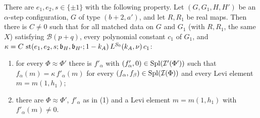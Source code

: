 \begin{lemma}\label{pf:thmK:keyA}
There are $e_1,e_2,s\in\{\pm1\}$ with the following property. Let $(G,G_1,H,H')$ be an $\alpha$-step configuration, $G$
of type $(b+2,a')$, and let $R,R_1$ be real maps. Then there is $C\ne0$ such that for all matched data on $G$ and $G_1$
(with $R,R_1$, the same $X$) satisfying $\mathcal B(p+q)$, every polynomial constant $c_1$ of $G_1$, and
$\kappa=C\,\operatorname{st}(e_1,e_2,s;\mathfrak b_H,\mathfrak b_{H'};1-k_A)\,L^{S_0}(k_A,\nu)\,c_1$:
\begin{enumerate}
\item for every $\Phi\approx\Phi'$ there is $f'_\alpha$ with $(f'_\alpha,0)\in\operatorname{Spl}(\mathcal{I}'(\Phi'))$ such that
$f_\alpha(m)=\kappa\,f'_\alpha(m)$ for every $(f_\alpha,f_\beta)\in\operatorname{Spl}(\mathcal{I}(\Phi))$ and every Levi element
$m=m(1,h_1)$;
\item there are $\Phi\approx\Phi'$, $f'_\alpha$ as in (1) and a Levi element $m=m(1,h_1)$ with $f'_\alpha(m)\ne0$.
\end{enumerate}
\end{lemma}

